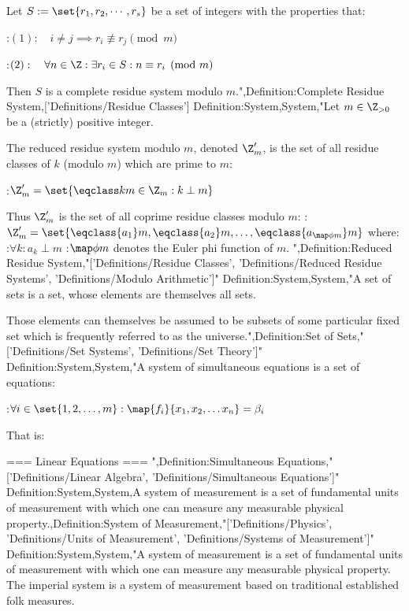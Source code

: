 Let $S := \set {r_1, r_2, \dotsb, r_s}$ be a set of integers with the properties that:

:$(1): \quad i \ne j \implies r_i \not \equiv r_j \pmod m$

:$(2): \quad \forall n \in \Z: \exists r_i \in S: n \equiv r_i \pmod m$


Then $S$ is a complete residue system modulo $m$.",Definition:Complete Residue System,['Definitions/Residue Classes']
Definition:System,System,"Let $m \in \Z_{> 0}$ be a (strictly) positive integer.


The reduced residue system modulo $m$, denoted $\Z'_m$, is the set of all residue classes of $k$ (modulo $m$) which are prime to $m$:

:$\Z'_m = \set {\eqclass k m \in \Z_m: k \perp m}$


Thus $\Z'_m$ is the set of all coprime residue classes modulo $m$:
:$\Z'_m = \set {\eqclass {a_1} m, \eqclass {a_2} m, \ldots, \eqclass {a_{\map \phi m} } m}$
where:
:$\forall k: a_k \perp m$
:$\map \phi m$ denotes the Euler phi function of $m$.
",Definition:Reduced Residue System,"['Definitions/Residue Classes', 'Definitions/Reduced Residue Systems', 'Definitions/Modulo Arithmetic']"
Definition:System,System,"A set of sets is a set, whose elements are themselves all sets.


Those elements can themselves be assumed to be subsets of some particular fixed set which is frequently referred to as the universe.",Definition:Set of Sets,"['Definitions/Set Systems', 'Definitions/Set Theory']"
Definition:System,System,"A system of simultaneous equations is a set of equations:

:$\forall i \in \set {1, 2, \ldots, m} : \map {f_i} {x_1, x_2, \ldots x_n} = \beta_i$


That is:









=== Linear Equations ===
",Definition:Simultaneous Equations,"['Definitions/Linear Algebra', 'Definitions/Simultaneous Equations']"
Definition:System,System,A system of measurement is a set of fundamental units of measurement with which one can measure any measurable physical property.,Definition:System of Measurement,"['Definitions/Physics', 'Definitions/Units of Measurement', 'Definitions/Systems of Measurement']"
Definition:System,System,"A system of measurement is a set of fundamental units of measurement with which one can measure any measurable physical property.
The imperial system is a system of measurement based on traditional established folk measures.

